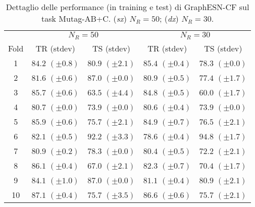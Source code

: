 \begin{table}[tbph]
\footnotesize
\caption[Dettaglio performance: GraphESN-CF su Mutag-AB+C]{Dettaglio delle performance (in training e test) di GraphESN-CF sul task Mutag-AB+C. (\emph{sx}) $N_R=50$; (\emph{dx}) $N_R=30$.}
\label{app:esp:Mutag-ABC-CF}
\centering
\begin{tabular}{c*{4}{c}}
\toprule
& \multicolumn{2}{c}{$N_R=50$} & \multicolumn{2}{c}{$N_R=30$}\\
Fold & TR (stdev) & TS (stdev) & TR (stdev) & TS (stdev)\\
\midrule
1 & $84.2$ $(\pm 0.8)$ & $80.9$ $(\pm 2.1)$ & $85.4$ $(\pm 0.4)$ & $78.3$ $(\pm 0.0)$\\
2 & $81.6$ $(\pm 0.6)$ & $87.0$ $(\pm 0.0)$ & $80.9$ $(\pm 0.5)$ & $77.4$ $(\pm 1.7)$\\
3 & $85.7$ $(\pm 0.6)$ & $63.5$ $(\pm 4.4)$ & $84.8$ $(\pm 0.5)$ & $60.0$ $(\pm 1.7)$\\
4 & $80.7$ $(\pm 0.0)$ & $73.9$ $(\pm 0.0)$ & $80.6$ $(\pm 0.4)$ & $73.9$ $(\pm 0.0)$\\
5 & $85.9$ $(\pm 0.6)$ & $75.7$ $(\pm 2.1)$ & $84.9$ $(\pm 0.7)$ & $76.5$ $(\pm 2.1)$\\
6 & $82.1$ $(\pm 0.5)$ & $92.2$ $(\pm 3.3)$ & $78.6$ $(\pm 0.4)$ & $94.8$ $(\pm 1.7)$\\
7 & $80.9$ $(\pm 0.2)$ & $78.3$ $(\pm 0.0)$ & $80.4$ $(\pm 0.5)$ & $72.2$ $(\pm 2.1)$\\
8 & $86.1$ $(\pm 0.4)$ & $67.0$ $(\pm 2.1)$ & $82.3$ $(\pm 0.7)$ & $70.4$ $(\pm 1.7)$\\
9 & $84.1$ $(\pm 1.0)$ & $87.0$ $(\pm 0.0)$ & $81.1$ $(\pm 0.4)$ & $80.9$ $(\pm 2.1)$\\
10 & $87.1$ $(\pm 0.4)$ & $75.7$ $(\pm 3.5)$ & $86.6$ $(\pm 0.6)$ & $75.7$ $(\pm 2.1)$\\
\bottomrule
\end{tabular}
\end{table}





